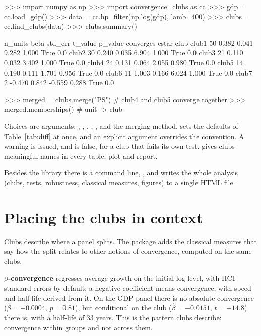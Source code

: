 \documentclass[article]{jss}
\begin{document}
\begin{CodeChunk}
\begin{CodeInput}
>>> import numpy as np
>>> import convergence_clubs as cc
>>> gdp = cc.load_gdp()
>>> data = cc.hp_filter(np.log(gdp), lamb=400)
>>> clubs = cc.find_clubs(data)
>>> clubs.summary()
\end{CodeInput}
\begin{CodeOutput}
        n_units   beta  std_err  t_value  p_value  converges  cstar
club
club1        50  0.382    0.041    9.282    1.000       True    0.0
club2        30  0.240    0.035    6.904    1.000       True    0.0
club3        21  0.110    0.032    3.402    1.000       True    0.0
club4        24  0.131    0.064    2.055    0.980       True    0.0
club5        14  0.190    0.111    1.701    0.956       True    0.0
club6        11  1.003    0.166    6.024    1.000       True    0.0
club7         2 -0.470    0.842   -0.559    0.288       True    0.0
\end{CodeOutput}
\begin{CodeInput}
>>> merged = clubs.merge("PS")      # club4 and club5 converge together
>>> merged.memberships()            # unit -> club
\end{CodeInput}
\end{CodeChunk}

Choices are arguments: , , ,
, ,  and the merging method.
 sets the  defaults of Table~\ref{tab:diff} at once,
and an explicit argument overrides the convention. A warning is issued, and
 is false, for a club that fails its own test.  gives
clubs meaningful names in every table, plot and report.

Besides the library there is a command line, , and
 writes the whole analysis (clubs, tests, robustness, classical
measures, figures) to a single HTML file.

\section{Placing the clubs in context} \label{sec:classical} 

Clubs describe where a panel splits. The package adds the classical measures that say how
the split relates to other notions of convergence, computed on the same clubs.

\textbf{$\beta$-convergence} \citep{Barro1992} regresses average growth on the initial log
level, with HC1 standard errors by default; a negative coefficient means convergence, with
speed and half-life derived from it. On the GDP panel there is no absolute convergence
($\hat\beta = -0.0004$, $p = 0.81$), but conditional on the club ($\hat\beta = -0.0151$,
$t = -14.8$) there is, with a half-life of 33 years. This is the pattern clubs describe:
convergence within groups and not across them.
\end{document}
